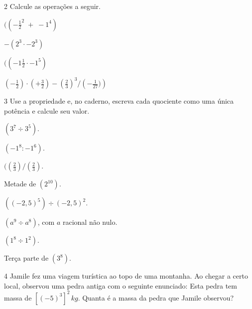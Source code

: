 \num{2} Calcule as operações a seguir.

\begin{escolha}[itemsep=0pt]
\item $(( - \frac{1}{2}^2 \; + \; -1^4)$ 
\item $ - (2^3 \cdot -2^3)$ 
\item $(( - 1\frac{1}{2} \cdot -1^5)$ 
\item $\left ( - \frac{1}{2} \right) \cdot \left( + \frac{3}{2} \right) - \left ( \frac{2}{3} \right)^{3} / \left ( - \frac{1}{27}) \right)$  
\end{escolha}







\num{3} Use a propriedade e, no caderno, escreva cada quociente como uma
única potência e calcule seu valor.


\begin{escolha}[itemsep=0pt]
\item $(3^7 \div 3^5)$. 
\item $(-1^8:-1^6)$. 
\item $(\left( \frac{2}{3} \right) / \left ( \frac{2}{3} \right)$. 
\item Metade de $(2^10)$. 
\item $((-2,5)^5) \div (-2,5)^2$. 
\item $(a^9 \div a^8)$, com $a$ racional não nulo.
\item $(1^8 \div 1^2)$.
\item Terça parte de $(3^8)$.
\end{escolha}



\num{4} Jamile fez uma viagem turística ao topo de uma montanha. Ao chegar a
certo local, observou uma pedra antiga com o seguinte enunciado: Esta
pedra tem massa de $[(-5)^3]^2\,kg$. Quanta é a massa da pedra que Jamile
observou?

